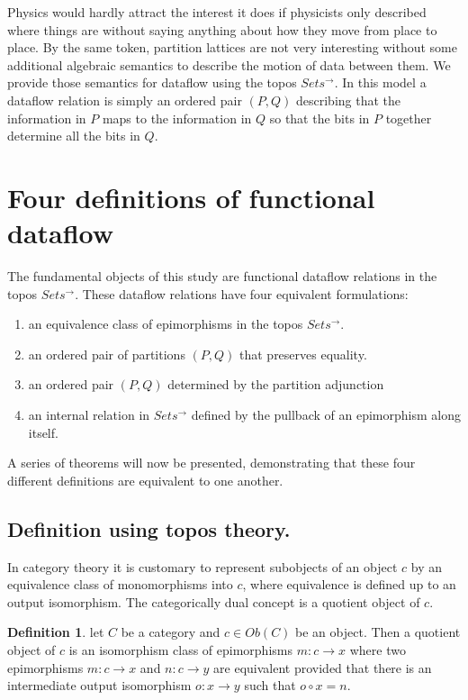 \documentclass[a4paper,11pt, notitlepage]{report}
\theoremstyle{definition}
\newtheorem{definition}{Definition}[section]
\begin{document}
Physics would hardly attract the interest it does if physicists only described where things are without saying anything about how they move from place to place. By the same token, partition lattices are not very interesting without some additional algebraic semantics to describe the motion of data between them. We provide those semantics for dataflow using the topos $Sets^{\to}$. In this model a dataflow relation is simply an ordered pair $(P,Q)$ describing that the information in $P$ maps to the information in $Q$ so that the bits in $P$ together determine all the bits in $Q$.
\vspace{\baselineskip}

\section{Four definitions of functional dataflow}
The fundamental objects of this study are functional dataflow relations in the topos $Sets^{\to}$. These dataflow relations have four equivalent formulations:

\begin{enumerate}
 \item an equivalence class of epimorphisms in the topos $Sets^{\to}$.
 \item an ordered pair of partitions $(P,Q)$ that preserves equality.
 \item an ordered pair $(P,Q)$ determined by the partition adjunction
  \item an internal relation in $Sets^{\to}$ defined by the pullback of an epimorphism along itself.
\end{enumerate}

A series of theorems will now be presented, demonstrating that these four different definitions are equivalent to one another.

\subsection{Definition using topos theory.}
In category theory it is customary to represent subobjects of an object $c$ by an equivalence class of monomorphisms into $c$, where equivalence is defined up to an output isomorphism. The categorically dual concept is a quotient object of $c$.

\begin{definition}
  let $C$ be a category and $c \in Ob(C)$ be an object. Then a quotient object of $c$ is an isomorphism class of epimorphisms $m: c \to x$ where two epimorphisms $m: c \to x$ and $n: c \to y$ are equivalent provided that there is an intermediate output isomorphism $o: x \to y$ such that $o \circ x = n$.
\end{definition}
\end{document}

